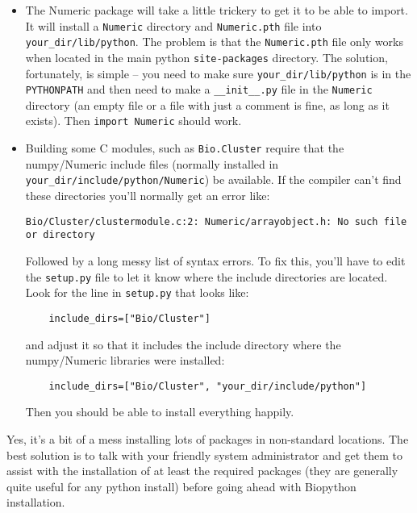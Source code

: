 \documentclass{article}
\begin{document}
\begin{itemize}
  \item The Numeric package will take a little trickery to get it to be
    able to import. It will install a \verb|Numeric| directory and
    \verb|Numeric.pth| file into \verb|your_dir/lib/python|. The problem
    is that the \verb|Numeric.pth| file only works when located in the main
    python \verb|site-packages| directory. The solution, fortunately, is
    simple -- you need to make sure \verb|your_dir/lib/python| is in the
    \verb|PYTHONPATH| and then need to make a \verb|__init__.py| file in
    the \verb|Numeric| directory (an empty file or a file with just a
    comment is fine, as long as it exists). Then \verb|import Numeric|
    should work.

  \item Building some C modules, such as \verb|Bio.Cluster| require that 
    the numpy/Numeric include files (normally installed in
    \verb|your_dir/include/python/Numeric|) be available. If the
    compiler can't find these directories you'll normally get an error
    like:

    \begin{verbatim}
Bio/Cluster/clustermodule.c:2: Numeric/arrayobject.h: No such file or directory
    \end{verbatim}

    Followed by a long messy list of syntax errors. To fix this, you'll
    have to edit the \verb|setup.py| file to let it know where the
    include directories are located. Look for the line in
    \verb|setup.py| that looks like:

    \begin{verbatim}
    include_dirs=["Bio/Cluster"]
    \end{verbatim}

    and adjust it so that it includes the include directory where the
    numpy/Numeric libraries were installed:
    
    \begin{verbatim}
    include_dirs=["Bio/Cluster", "your_dir/include/python"]
    \end{verbatim}

    Then you should be able to install everything happily.

\end{itemize}

Yes, it's a bit of a mess installing lots of packages in non-standard
locations. The best solution is to talk with your friendly system
administrator and get them to assist with the installation of at least
the required packages (they are generally quite useful for any python
install) before going ahead with Biopython installation.
\end{document}
